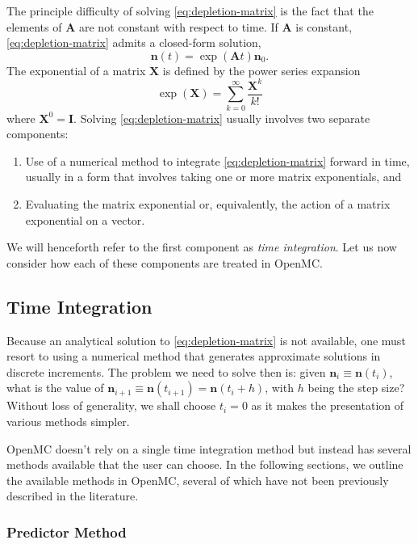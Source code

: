 \documentclass[3p,authoryear]{elsarticle}
\newcommand{\vect}[1]{\mathbf{#1}} %
\begin{document}
The principle difficulty of solving \cref{eq:depletion-matrix} is the fact that
the elements of $\vect{A}$ are not constant with respect to time. If
$\vect{A}$ is constant, \cref{eq:depletion-matrix} admits a closed-form
solution,
\begin{equation}
  \label{eq:constant-A}
  \vect{n}(t) = \exp \left (\vect{A} t \right ) \vect{n}_0.
\end{equation}
The exponential of a matrix $\vect{X}$ is defined by the power series
expansion
\begin{equation}
  \exp(\vect{X}) = \sum\limits_{k=0}^\infty \frac{\vect{X}^k}{k!}
\end{equation}
where $\vect{X}^0 = \vect{I}$. Solving \cref{eq:depletion-matrix} usually
involves two separate components:
\begin{enumerate}
  \item Use of a numerical method to integrate \cref{eq:depletion-matrix}
  forward in time, usually in a form that involves taking one or more matrix
  exponentials, and
  \item Evaluating the matrix exponential or, equivalently, the action of a
  matrix exponential on a vector.
\end{enumerate}
We will henceforth refer to the first component as \emph{time integration}. Let
us now consider how each of these components are treated in OpenMC.

\subsection{Time Integration}
\label{sec:time_integration}

Because an analytical solution to \cref{eq:depletion-matrix} is not available,
one must resort to using a numerical method that generates approximate solutions
in discrete increments. The problem we need to solve then is: given $\vect{n}_i
\equiv \vect{n}(t_i)$, what is the value of $\vect{n}_{i+1} \equiv
\vect{n}(t_{i+1}) = \vect{n}(t_i + h)$, with $h$ being the step size? Without
loss of generality, we shall choose $t_i=0$ as it makes the presentation of
various methods simpler.

OpenMC doesn't rely on a single time integration method but instead has several
methods available that the user can choose. In the following sections, we
outline the available methods in OpenMC, several of which have not been
previously described in the literature.

\subsubsection{Predictor Method}
\end{document}
